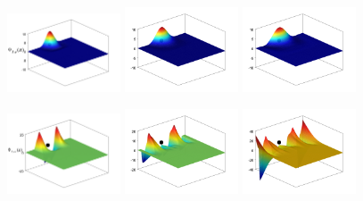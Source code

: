 \begin{figure}[H]
\begin{subcaptiongroup}
    \end{subcaptiongroup}
    \begin{subcaptiongroup}
    \includegraphics[width=0.3\textwidth]{figure/nomesh/QD77/3.png}
    \includegraphics[width=0.3\textwidth]{figure/nomesh/C77/3.png}
    \includegraphics[width=0.3\textwidth]{figure/nomesh/QT77/3.png}
    \end{subcaptiongroup}
    \begin{subcaptiongroup}
        \includegraphics[width=0.3\textwidth]{figure/nomesh/QD77/4.png}
        \includegraphics[width=0.3\textwidth]{figure/nomesh/C77/4.png}
        \includegraphics[width=0.3\textwidth]{figure/nomesh/QT77/4.png}

\end{subcaptiongroup}
\end{figure}
